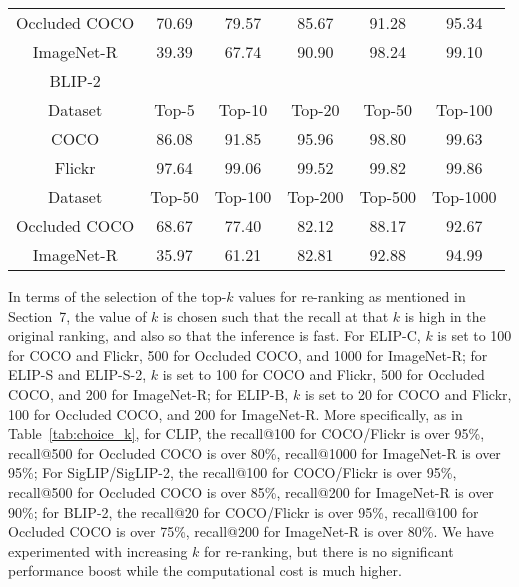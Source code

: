 \begin{table*}[h]
\begin{tabular}{cccccc}
Occluded COCO & 70.69 & 79.57 & 85.67 & 91.28 & 95.34 \\
ImageNet-R & 39.39 & 67.74 & 90.90 & 98.24 & 99.10 \\

\bottomrule




\toprule
 BLIP-2 & & & & & \\
\midrule 
Dataset & Top-5 & Top-10 & Top-20 & Top-50 & Top-100 \\

COCO & 86.08 & 91.85 & 95.96 & 98.80 & 99.63 \\
Flickr & 97.64 & 99.06 & 99.52 & 99.82 & 99.86 \\

\midrule

Dataset & Top-50 & Top-100 & Top-200 & Top-500 & Top-1000 \\

Occluded COCO & 68.67 & 77.40 & 82.12 & 88.17 & 92.67 \\
ImageNet-R & 35.97 & 61.21 & 82.81 & 92.88 & 94.99 \\

    \bottomrule


    
    \end{tabular}
    \caption{\textbf{Recall @ Different $k$ for CLIP, SigLIP and BLIP-2 initial ranking.} See text for a more detailed discussion.}
    \label{tab:choice_k}
\end{table*}



In terms of the selection of the top-$k$ values for re-ranking as mentioned in Section~7, the value of $k$ is chosen such that the recall at that $k$ is high in the original ranking, and also so that the inference is fast. 
For ELIP-C, $k$ is set to 100 for COCO and Flickr, 500 for Occluded COCO, and 1000 for ImageNet-R; for ELIP-S and ELIP-S-2, $k$ is set to 100 for COCO and Flickr, 500 for Occluded COCO, and 200 for ImageNet-R; for ELIP-B, $k$ is set to 20 for COCO and Flickr, 100 for Occluded COCO, and 200 for ImageNet-R. 
More specifically, as in Table~\ref{tab:choice_k}, for 
CLIP, the recall@100 for COCO/Flickr is over 95\%, recall@500 for Occluded COCO is over 80\%, recall@1000 for ImageNet-R is over 95\%; For SigLIP/SigLIP-2, the recall@100 for COCO/Flickr is over 95\%, recall@500 for Occluded COCO is over 85\%, recall@200 for ImageNet-R is over 90\%; for BLIP-2, the recall@20 for COCO/Flickr is over 95\%, recall@100 for Occluded COCO is over 75\%, recall@200 for ImageNet-R is over 80\%. 
We have experimented with increasing $k$ for re-ranking, but there is no significant performance boost while the computational cost is much higher.

